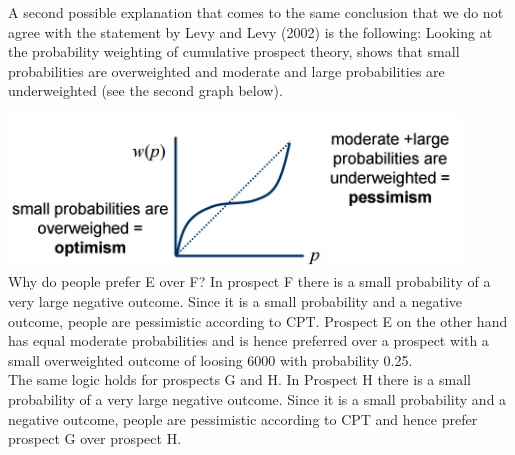 \documentclass{article}
\begin{document}
A second possible explanation that comes to the same conclusion that we do not agree with
the statement by Levy and Levy (2002) is the following:
Looking at the probability weighting of cumulative prospect theory, shows that small
probabilities are overweighted and moderate and large probabilities are underweighted (see the second graph below). 

\includegraphics[width=12cm]{Figure2.png} \\

Why do people prefer E over F? In prospect F there is a small probability of a very large
negative outcome. Since it is a small probability and a negative outcome, people are
pessimistic according to CPT. Prospect E on the other hand has equal moderate probabilities
and is hence preferred over a prospect with a small overweighted outcome of loosing 6000
with probability 0.25. \\

The same logic holds for prospects G and H. In Prospect H there is a small probability of a
very large negative outcome. Since it is a small probability and a negative outcome, people
are pessimistic according to CPT and hence prefer prospect G over prospect H.
\end{document}
